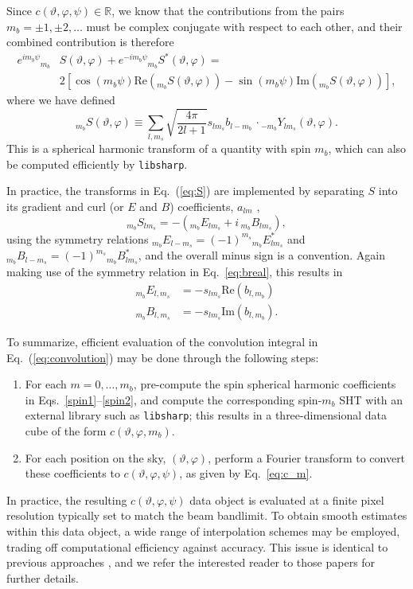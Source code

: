 \documentclass[twocolumn]{aa}
\newcommand{\mbeam}{\ensuremath{m_b}}
\newcommand{\cvar}{\ensuremath{c(\vartheta, \varphi, \psi)}}
\begin{document}
Since $\cvar \in \mathbb{R}$, we know that the contributions from the pairs
$m_b=\pm 1, \pm 2, \dots$ must be complex conjugate with respect to each other, and their combined
contribution is therefore 
\begin{align}
e^{im_b\psi}{}_{m_b}&S(\vartheta,\varphi) + e^{-im_b\psi}{}_{m_b}S^\ast(\vartheta,\varphi) =
 \\\nonumber
 &2\left[\cos(m_b\psi)\text{Re}({}_{m_b}S(\vartheta,\varphi)) -
 \sin(m_b\psi)\text{Im}({}_{m_b}S(\vartheta,\varphi))\right],
\end{align}
where we have defined
\begin{equation}
{}_{m_b}S(\vartheta,\varphi) \equiv \sum_{l,m_s} \sqrt{\frac{4\pi}{2l+1}} s_{lm_s}
b_{l-m_b}\, \cdot {}_{-m_b}Y_{lm_s}(\vartheta,\varphi).
\label{eq:S}
\end{equation}
This is a spherical harmonic transform of a quantity with spin $m_b$,
which can also be computed efficiently by \texttt{libsharp}.

In practice, the transforms in Eq.~(\ref{eq:S}) are implemented by
separating $S$ into its gradient and curl (or $E$ and $B$)
coefficients, $a_{lm}$ \citep{lewis_2005}, 
\begin{equation}
{}_{m_b}S_{lm_s} = -\left({}_{m_b}E_{lm_s} + i\,{}_{m_b}B_{lm_s}\right),
\end{equation}
using the symmetry relations
${}_{m_b}E_{l-m_s}=(-1)^{m_s}{}_{m_b}E_{lm_s}^*$ and
${}_{m_b}B_{l-m_s}=(-1)^{m_s}{}_{m_b}B_{lm_s}^*$, and the overall minus sign is a convention. Again making use of the symmetry relation
in Eq.~\eqref{eq:breal}, this results in
\begin{align}
  {}_{m_b}E_{l,m_s} &= -s_{lm_s} \text{Re}(b_{l,\mbeam}) \label{spin1}\\
  {}_{m_b}B_{l,m_s} &= -s_{lm_s} \text{Im}(b_{l,\mbeam}) \label{spin2}.
\end{align}

To summarize, efficient evaluation of the convolution integral in
Eq.~(\ref{eq:convolution}) may be done through the following steps:
\begin{enumerate}
  \item For each $m = {0,\ldots, m_{b}}$, pre-compute the spin spherical
    harmonic coefficients in Eqs.~\eqref{spin1}--\eqref{spin2}, and
    compute the corresponding spin-$m_{b}$ SHT
    with an external library such as \texttt{libsharp}; this results
    in a three-dimensional data cube of the form
    $c(\vartheta,\varphi,m_{b})$.
  \item For each position on the sky, $(\vartheta,\varphi)$, perform a
    Fourier transform to convert these coefficients to
    $c(\vartheta,\varphi,\psi)$, as given by Eq.~\eqref{eq:c_m}.
\end{enumerate}
In practice, the resulting $c(\vartheta,\varphi,\psi)$ data object is
evaluated at a finite pixel resolution typically set to match the beam
bandlimit. To obtain smooth estimates within this data object, a wide
range of interpolation schemes may be employed, trading off
computational efficiency against accuracy. This issue is
identical to previous approaches \citep{Wandelt:2001,conviqt},
and we refer the interested reader to those papers for further details.
\end{document}
